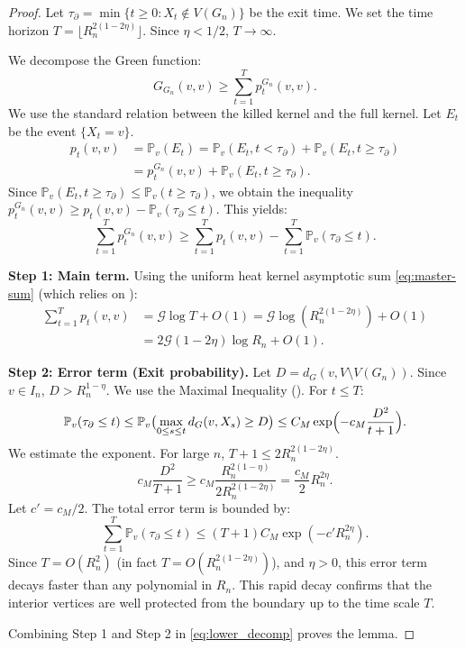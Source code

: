 \documentclass{article}
\numberwithin{equation}{section}
\theoremstyle{definition}
\theoremstyle{remark}
\newcommand{\cG}{\mathcal{G}}
\newcommand{\Prob}{\mathbb{P}}
\begin{document}
\begin{proof}
Let $\tau_{\partial} = \min\{t \geq 0 : X_t \notin V(G_n)\}$ be the exit time. We set the time horizon $T = \lfloor R_n^{2(1-2\eta)} \rfloor$. Since $\eta < 1/2$, $T \to \infty$.

We decompose the Green function:
\[
G_{G_n}(v,v) \geq \sum_{t=1}^{T} p_t^{G_n}(v,v).
\]
We use the standard relation between the killed kernel and the full kernel. Let $E_t$ be the event $\{X_t = v\}$.
\begin{align*}
p_t(v,v) &= \Prob_v(E_t) = \Prob_v(E_t, t < \tau_{\partial}) + \Prob_v(E_t, t \geq \tau_{\partial}) \\
&= p_t^{G_n}(v,v) + \Prob_v(E_t, t \geq \tau_{\partial}).
\end{align*}
Since $\Prob_v(E_t, t \geq \tau_{\partial}) \leq \Prob_v(t \geq \tau_{\partial})$, we obtain the inequality $p_t^{G_n}(v,v) \geq p_t(v,v) - \Prob_v(\tau_{\partial} \leq t)$. This yields:
\begin{equation}\label{eq:lower_decomp}
\sum_{t=1}^{T} p_t^{G_n}(v,v) \geq \sum_{t=1}^{T} p_t(v,v) - \sum_{t=1}^{T} \Prob_v(\tau_{\partial} \leq t).
\end{equation}

\textbf{Step 1: Main term.} Using the uniform heat kernel asymptotic sum \eqref{eq:master-sum} (which relies on ):
\begin{align*}
\sum_{t=1}^{T} p_t(v,v) &= \cG \log T + O(1)
  = \cG \log(R_n^{2(1-2\eta)}) + O(1) \\
&= 2\cG (1-2\eta)\log R_n + O(1).
\end{align*}

\textbf{Step 2: Error term (Exit probability).} Let $D = d_G(v, V \setminus V(G_n))$. Since $v \in I_n$, $D > R_n^{1-\eta}$. We use the Maximal Inequality (). For $t \leq T$:
\[
\Prob_v(\tau_{\partial} \leq t) \leq \Prob_v\bigl( \max_{0 \leq s \leq t} d_G(v,X_s) \geq D \bigr) \leq C_M \exp\Bigl(-c_M \frac{D^2}{t+1}\Bigr).
\]
We estimate the exponent. For large $n$, $T+1 \leq 2 R_n^{2(1-2\eta)}$.
\[
c_M \frac{D^2}{T+1} \geq c_M \frac{R_n^{2(1-\eta)}}{2 R_n^{2(1-2\eta)}} = \frac{c_M}{2} R_n^{2\eta}.
\]
Let $c' = c_M/2$. The total error term is bounded by:
\[
\sum_{t=1}^T \Prob_v(\tau_{\partial} \leq t) \leq (T+1) C_M \exp(-c' R_n^{2\eta}).
\]
Since $T = O(R_n^2)$ (in fact $T=O(R_n^{2(1-2\eta)})$), and $\eta>0$, this error term decays faster than any polynomial in $R_n$. This rapid decay confirms that the interior vertices are well protected from the boundary up to the time scale $T$.

Combining Step 1 and Step 2 in \eqref{eq:lower_decomp} proves the lemma.
\end{proof}
\end{document}
